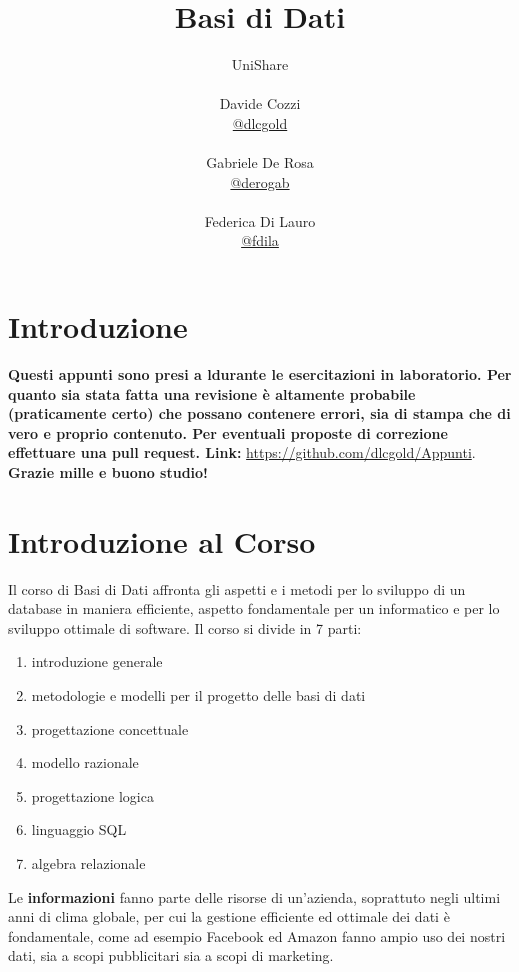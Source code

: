 \documentclass[a4paper,12pt, oneside]{book}
\title{Basi di Dati}
\author{UniShare\\\\Davide Cozzi\\\href{https://t.me/dlcgold}{@dlcgold}\\\\Gabriele De Rosa\\\href{https://t.me/derogab}{@derogab} \\\\Federica Di Lauro\\\href{https://t.me/f_dila}{@f\textunderscore dila}}
\date{}
\begin{document}
\maketitle

\newtheorem{teorema}{Teorema}
\newtheorem{definizione}{Definizione}
\newtheorem{esempio}{Esempio}
\newtheorem{corollario}{Corollario}
\newtheorem{lemma}{Lemma}
\newtheorem{osservazione}{Osservazione}
\newtheorem{nota}{Nota}
\newtheorem{esercizio}{Esercizio}
\tableofcontents
\renewcommand{\chaptermark}[1]{%
	\markboth{\chaptername
		\ \thechapter.\ #1}{}}
\renewcommand{\sectionmark}[1]{\markright{\thesection.\ #1}}
\chapter{Introduzione}
\textbf{Questi appunti sono presi a ldurante le esercitazioni in laboratorio. Per quanto sia stata fatta una revisione è altamente probabile (praticamente certo) che possano contenere errori, sia di stampa che di vero e proprio contenuto. Per eventuali proposte di correzione effettuare una pull request. Link: } \url{https://github.com/dlcgold/Appunti}.\\
\textbf{Grazie mille e buono studio!}
\chapter{Introduzione al Corso}
Il corso di Basi di Dati affronta gli aspetti e i metodi per lo sviluppo di un database in maniera efficiente,
aspetto fondamentale per un informatico e per lo sviluppo ottimale di software. \newline
Il corso si divide in 7 parti:
\begin{enumerate}
	\item introduzione generale
	\item metodologie e modelli per il progetto delle basi di dati
	\item progettazione concettuale
	\item modello razionale
	\item progettazione logica
	\item linguaggio SQL
	\item algebra relazionale
\end{enumerate}
Le \textbf{informazioni} fanno parte delle risorse di un'azienda, soprattuto negli ultimi anni di clima globale,
per cui la gestione efficiente ed ottimale dei dati è fondamentale, come ad esempio Facebook ed Amazon fanno ampio
uso dei nostri dati, sia a scopi pubblicitari sia a scopi di marketing.
\end{document}
